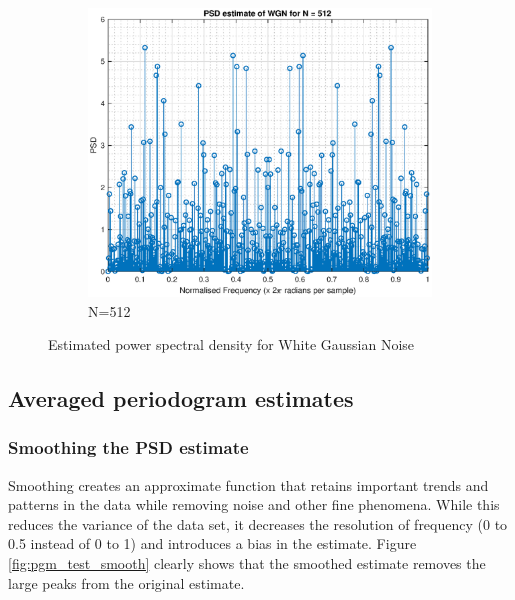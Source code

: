 \documentclass{article}
\begin{document}
\begin{figure}[h!]
\begin{subfigure}{0.32\textwidth}
\centering
\includegraphics[width = \textwidth]{pgm_512}
\caption{N=512}
\label{fig:pgm_512}
\end{subfigure}
\caption{Estimated power spectral density for White Gaussian Noise}
\label{fig:pgm_test}
\end{figure}


\subsection{Averaged periodogram estimates}


\subsubsection{Smoothing the PSD estimate}

Smoothing creates an approximate function that retains important trends and patterns in the data while removing noise and other fine phenomena. While this reduces the variance of the data set, it decreases the resolution of frequency (0 to 0.5 instead of 0 to 1) and introduces a bias in the estimate. Figure \ref{fig:pgm_test_smooth} clearly shows that the smoothed estimate removes the large peaks from the original estimate.
\end{document}
